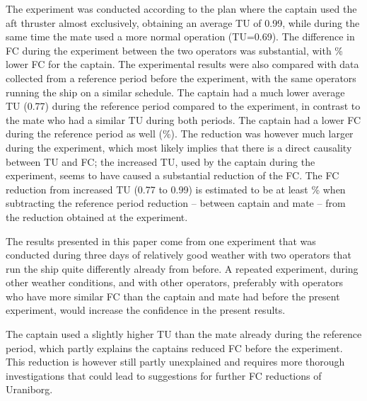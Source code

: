 The experiment was conducted according to the plan where the captain used the aft thruster almost exclusively, obtaining an average TU of 0.99, while during the same time the mate used a more normal operation (TU=0.69). The difference in FC during the experiment between the two operators was substantial, with \savingpctexperiment \% lower FC for the captain. 
The experimental results were also compared with data collected from a reference period before the experiment, with the same operators running the ship on a similar schedule. The captain had a much lower average TU (0.77) during the reference period compared to the experiment, in contrast to the mate who had a similar TU during both periods. The captain had a lower FC during the reference period as well (\savingpctbeforeexperiment \%).
The reduction was however much larger during the experiment, which most likely implies that there is a direct causality between TU and FC; the increased TU, used by the captain during the experiment, seems to have caused a substantial reduction of the FC. The FC reduction from increased TU (0.77 to 0.99) is estimated to be at least \savingthrusterallocationpct \% when subtracting the reference period reduction -- between captain and mate -- from the reduction obtained at the experiment. 

The results presented in this paper come from one experiment that was conducted during three days of relatively good weather with two operators that run the ship quite differently already from before.
A repeated experiment, during other weather conditions, and with other operators, preferably with operators who have more similar FC than the captain and mate had before the present experiment, would increase the confidence in the present results.

The captain used a slightly higher TU than the mate already during the reference period, which partly explains the captains reduced FC before the experiment. %
This reduction is however still partly unexplained and requires more thorough investigations that could lead to suggestions for further FC reductions of Uraniborg.
